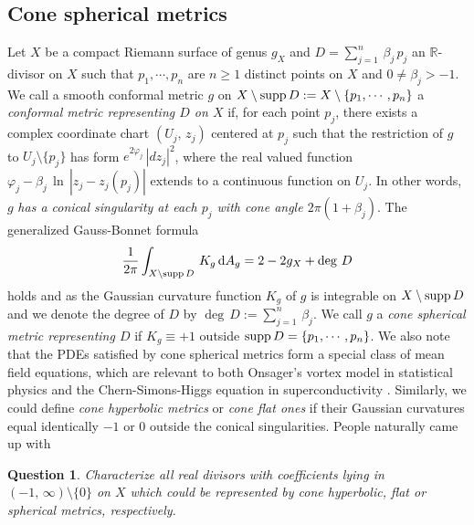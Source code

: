 \documentclass[12pt]{article}
\newtheorem{qu}{Question}[section]
\begin{document}
\subsection{Cone spherical metrics}
\label{sec:knownresult}
Let $X$ be a compact Riemann surface of genus $g_X$ and $D = \sum_{j=1}^n \, \beta_j \, p_j$ an $\mathbb{R}$-divisor on $X$ such that $p_1, \cdots, p_n$ are $n \geq 1$ distinct  points on $X$ and $0 \neq \beta_j > -1$. We call a smooth conformal metric $g$ on $X \setminus {\rm supp} \, D := X \setminus \{p_1, \cdots, p_n\}$ a {\it conformal metric representing $D$ on $X$} if, for each point $p_j$, there exists a complex coordinate chart $(U_{j}, \, z_{j})$ centered at $p_j$ such that the restriction of $g$ to $U_{j} \setminus \{ p_j \}$ has form $e^{2 \varphi_{j} } \, |dz_{j}|^2$, where the real valued function $\varphi_{j} - \beta_j \, \ln \, |z_{j} - z_{j}(p_{j})|$ extends to a continuous function on $U_{j}$. In other words,  $g$ {\it has a conical singularity at each $p_j$ with cone angle $2 \pi( 1 + \beta_j )$}.  The generalized Gauss-Bonnet formula
\begin{equation}
\label{equ:GB}
 \frac{1}{2\pi}\int_{X\setminus {\rm supp}\, D}\, K_g \, {\rm d}A_g = 2-2g_X+\deg\, D
\end{equation}
holds \cite[Proposition 1]{Troyanov91} and \cite[Theorem 1]{Fang2019} as the Gaussian curvature function $K_g$ of $g$ is integrable on $X \setminus {\rm supp}\, D$ and
we denote the degree of $D$ by $\deg \, D := \sum_{j=1}^n \, \beta_j$. We call $g$ a {\it cone spherical metric representing $D$} if $K_g \equiv +1$ outside ${\rm supp} \, D=\{p_1, \cdots, p_n\}$. We also note that the PDEs satisfied by cone spherical metrics form a special class of mean field equations, which are relevant to both Onsager's vortex model in statistical physics \cite{CLMP92} and the Chern-Simons-Higgs equation in superconductivity \cite{CLW2004}. Similarly, we could define {\it cone hyperbolic metrics} or {\it cone flat ones} if their Gaussian curvatures equal identically $-1$ or $0$ outside the conical singularities. People naturally came up with

\begin{qu}
\label{qu:hfs}
Characterize all real divisors with coefficients lying in $(-1,\, \infty)\setminus\{0\}$ on $X$ which could be represented by cone hyperbolic, flat or spherical metrics, respectively.
\end{qu}
\end{document}
